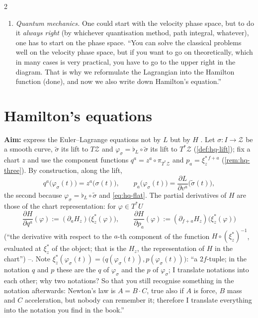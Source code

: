\begin{paracol}{2}
\begin{enumerate}
  \item \emph{Quantum mechanics.} One could start with the velocity phase space, but to do it \emph{always right} (by whichever quantisation method, path integral, whatever), one has to start on the phase space. ``You can solve the classical problems well on the velocity phase space, but if you want to go on theoretically, which in many cases is very practical, you have to go to the upper right in the diagram. That is why we reformulate the Lagrangian into the Hamilton function (done), and now we also write down Hamilton's equation.'' 
\end{enumerate}

\section{Hamilton's equations}\label{sec:hq-hamiltoneq}

\textbf{Aim:} express the Euler--Lagrange equations not by $L$ but by $H$ . Let $\sigma\colon I\to\mathcal Z$ be a smooth curve, $\tilde\sigma$ its lift to $T\mathcal Z$ and $\varphi_\sigma=\flat_L\circ\tilde\sigma$ its lift to $T^*\mathcal Z$ (\cref{def:hq-lift}); fix a chart $z$ and use the component functions $q^a=z^a\circ\pi_{T^*\mathcal Z}$ and $p_a=\xi^{*\,f+a}_z$ (\cref{rem:hq-three}). By construction, along the lift,
\begin{equation}\label{eq:hq-qp}
  q^a\bigl(\varphi_\sigma(t)\bigr)=z^a\bigl(\sigma(t)\bigr),\qquad p_a\bigl(\varphi_\sigma(t)\bigr)=\frac{\partial L}{\partial v^a}\bigl(\tilde\sigma(t)\bigr),
\end{equation}
the second because $\varphi_\sigma=\flat_L\circ\tilde\sigma$ and \eqref{eq:hq-flat}. The partial derivatives of $H$ are those of the chart representation: for $\varphi\in T^*U$
\[
  \frac{\partial H}{\partial q^a}(\varphi):=(\partial_aH_z)\bigl(\xi^*_z(\varphi)\bigr),\qquad \frac{\partial H}{\partial p_a}(\varphi):=(\partial_{f+a}H_z)\bigl(\xi^*_z(\varphi)\bigr)
\]
(``the derivative with respect to the $a$-th component of the function $H\circ(\xi^*_z)^{-1}$, evaluated at $\xi^*_z$ of the object; that is the $H_z$, the representation of $H$ in the chart'') --. Note $\xi^*_z(\varphi_\sigma(t))=\bigl(q(\varphi_\sigma(t)),p(\varphi_\sigma(t))\bigr)$: ``a $2f$-tuple; in the notation $q$ and $p$ these are the $q$ of $\varphi_\sigma$ and the $p$ of $\varphi_\sigma$; I translate notations into each other; why two notations? So that you still recognise something in the notation afterwards: Newton's law is $A=B\cdot C$, true also if $A$ is force, $B$ mass and $C$ acceleration, but nobody can remember it; therefore I translate everything into the notation you find in the book.'' 


\end{paracol}
